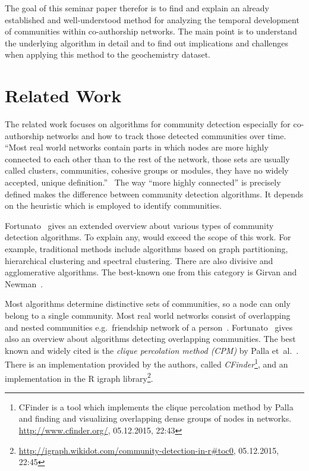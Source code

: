 \documentclass[runningheads,a4paper]{llncs}
\begin{document}
The goal of this seminar paper therefor is to find and explain an already established and well-understood method for analyzing the temporal development of communities within co-authorship networks. The main point is to understand the underlying algorithm in detail and to find out implications and challenges when applying this method to the geochemistry dataset.

\section{Related Work}
\label{related}
The related work focuses on algorithms for community detection especially for co-authorship networks and how to track those detected communities over time.
``Most real world networks contain parts in which nodes are more highly connected to each other than to the rest of the network, those sets are usually called clusters, communities, cohesive groups or modules, they have no widely accepted, unique definition.''~\cite{palla2005uncovering}
The way ``more highly connected'' is precisely defined makes the difference between community detection algorithms.
It depends on the heuristic which is employed to identify communities.~\cite{porter2009communities}

Fortunato~\cite{fortunato2010community} gives an extended overview about various types of community detection algorithms.
To explain any, would exceed the scope of this work.
For example, traditional methods include algorithms based on graph partitioning, hierarchical clustering and spectral clustering.
There are also divisive and agglomerative algorithms.
The best-known one from this category is Girvan and Newman~\cite{girvan2002community}.

Most algorithms determine distinctive sets of communities, so a node can only belong to a single community. Most real world networks consist of overlapping and nested communities e.g.~friendship network of a person~\cite{palla2005uncovering}.
Fortunato~\cite{fortunato2010community} gives also an overview about algorithms detecting overlapping communities.
The best known and widely cited is the \emph{clique percolation method (CPM)} by Palla et~al.~\cite{palla2005uncovering}.
There is an implementation provided by the authors, called \emph{CFinder}\footnote{CFinder is a tool which implements the clique percolation method by Palla and finding and visualizing overlapping dense groups of nodes in networks. \url{http://www.cfinder.org/}, 05.12.2015, 22:43}, and an implementation in the R igraph library\footnote{\url{http://igraph.wikidot.com/community-detection-in-r#toc0}, 05.12.2015, 22:45}.
\end{document}
